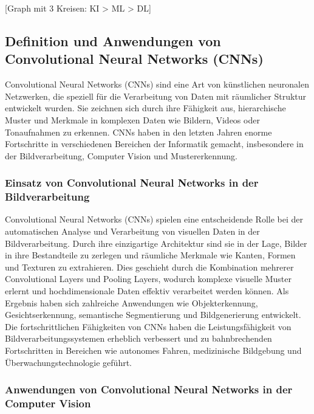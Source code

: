[Graph mit 3 Kreisen: KI > ML > DL]

    \subsection{Definition und Anwendungen von Convolutional Neural Networks (CNNs)}
    
        Convolutional Neural Networks (CNNs) sind eine Art von künstlichen neuronalen Netzwerken, die speziell für die Verarbeitung von Daten mit räumlicher Struktur entwickelt wurden. 
        Sie zeichnen sich durch ihre Fähigkeit aus, hierarchische Muster und Merkmale in komplexen Daten wie Bildern, Videos oder Tonaufnahmen zu erkennen. 
        CNNs haben in den letzten Jahren enorme Fortschritte in verschiedenen Bereichen der Informatik gemacht, insbesondere in der Bildverarbeitung, Computer Vision und Mustererkennung.
        
        \subsubsection{Einsatz von Convolutional Neural Networks in der Bildverarbeitung}
    
            Convolutional Neural Networks (CNNs) spielen eine entscheidende Rolle bei der automatischen Analyse und Verarbeitung von visuellen Daten in der Bildverarbeitung. 
            Durch ihre einzigartige Architektur sind sie in der Lage, Bilder in ihre Bestandteile zu zerlegen und räumliche Merkmale wie Kanten, Formen und Texturen zu extrahieren. 
            Dies geschieht durch die Kombination mehrerer Convolutional Layers und Pooling Layers, wodurch komplexe visuelle Muster erlernt und hochdimensionale Daten effektiv verarbeitet werden können. Als Ergebnis haben sich zahlreiche Anwendungen wie Objekterkennung, Gesichtserkennung, semantische Segmentierung und Bildgenerierung entwickelt. 
            Die fortschrittlichen Fähigkeiten von CNNs haben die Leistungsfähigkeit von Bildverarbeitungssystemen erheblich verbessert und zu bahnbrechenden Fortschritten in Bereichen wie autonomes Fahren, medizinische Bildgebung und Überwachungstechnologie geführt.
        
        \subsubsection{Anwendungen von Convolutional Neural Networks in der Computer Vision}
        
